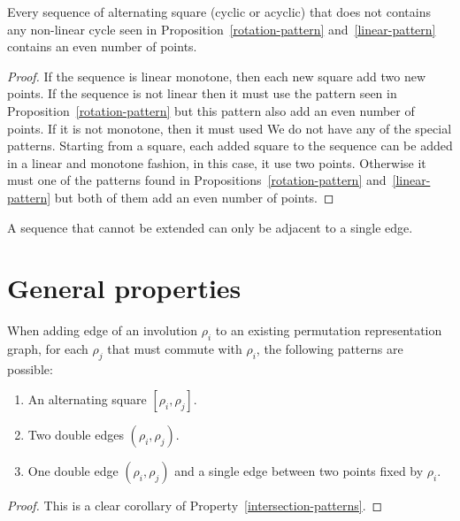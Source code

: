 \begin{corollary}
  \label{even-sequence}
  Every sequence of alternating square (cyclic or acyclic) that does not contains any non-linear cycle seen in Proposition~\ref{rotation-pattern} and~\ref{linear-pattern} contains an even number of points.
\end{corollary}

\begin{proof}
  If the sequence is linear monotone, then each new square add two new points. If the sequence is not linear then it must use the pattern seen in Proposition~\ref{rotation-pattern} but this pattern also add an even number of points. If it is not monotone, then it must used
  We do not have any of the special patterns. Starting from a square, each added square to the sequence can be added in a linear and monotone fashion, in this case, it use two points. Otherwise it must one of the patterns found in Propositions~\ref{rotation-pattern} and~\ref{linear-pattern} but both of them add an even number of points.
\end{proof}

\begin{proposition}
  \label{sequence-connection}
  A sequence that cannot be extended can only be adjacent to a single edge.
\end{proposition}

\section{General properties}

\begin{proposition}
  \label{patterns-adding}
  When adding edge of an involution $\rho_i$ to an existing permutation representation graph, for each $\rho_j$ that must commute with $\rho_i$, the following patterns are possible:
  \begin{enumerate}
    \item An alternating square $[\rho_i, \rho_j]$.
    \item Two double edges $(\rho_i, \rho_j)$.
    \item One double edge $(\rho_i, \rho_j)$ and a single edge between two points fixed by $\rho_i$.
  \end{enumerate}
\end{proposition}

\begin{proof}
  This is a clear corollary of Property~\ref{intersection-patterns}.
\end{proof}

